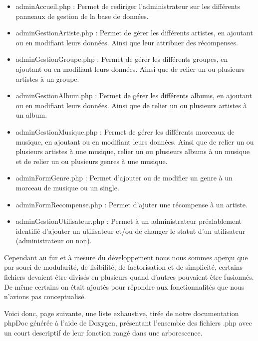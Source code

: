        	\begin{paragraphe}
        		\begin{itemize}
        			\item adminAccueil.php : Permet de rediriger l'administrateur sur les différents panneaux de gestion de la base de données.
        			\item adminGestionArtiste.php : Permet de gérer les différents artistes, en ajoutant ou en modifiant leurs données. Ainsi que leur attribuer des récompenses.
        			\item adminGestionGroupe.php : Permet de gérer les différents groupes, en ajoutant ou en modifiant leurs données. Ainsi que de relier un ou plusieurs artistes à un groupe.
        			\item adminGestionAlbum.php : Permet de gérer les différents albums, en ajoutant ou en modifiant leurs données. Ainsi que de relier un ou plusieurs artistes à un album.
        			\item adminGestionMusique.php : Permet de gérer les différents morceaux de musique, en ajoutant ou en modifiant leurs données. Ainsi que de relier un ou plusieurs artistes à une musique, relier un ou plusieurs albums à un musique et de relier un ou plusieurs genres à une musique.
        			\item adminFormGenre.php : Permet d'ajouter ou de modifier un genre à un morceau de musique ou un single.
        			\item adminFormRecompense.php : Permet d'ajuter une récompense à un artiste.
        			\item adminGestionUtilisateur.php : Permet à un administrateur préalablement identifié d'ajouter un utilisateur et/ou de changer le statut d'un utilisateur (administrateur ou non).
        		\end{itemize}
        	\end{paragraphe}

        	\begin{paragraphe}
                Cependant au fur et à mesure du développement nous nous sommes aperçu que par souci de modularité, de lisibilité, de factorisation et de simplicité,
                certains fichiers devaient être divisés en plusieurs quand d'autres pouvaient être fusionnés.
                De même certains on était ajoutés pour répondre aux fonctionnalités que nous n'avions pas conceptualisé.
            \end{paragraphe}

            \begin{paragraphe}
                Voici donc, page suivante, une liste exhaustive, tirée de notre documentation phpDoc générée à l'aide de Doxygen, présentant l'ensemble des fichiers .php avec un court descriptif de leur
                fonction rangé dans une arborescence.
            \end{paragraphe}

